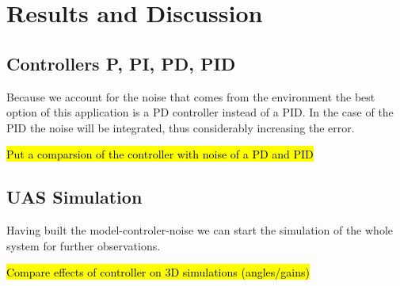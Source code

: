 \chapter{Results and Discussion}\label{ch:results}

\section{Controllers P, PI, PD, PID}

Because we account for the noise that comes from the environment the best option of this application is a PD controller instead of a PID. In the case of the PID the noise will be integrated, thus considerably increasing the error. 

\hl{Put a comparsion of the controller with noise of a PD and PID} 

\section{UAS Simulation}

Having built the model-controler-noise we can start the simulation of the whole system for further observations.

\hl{Compare effects of controller on 3D simulations (angles/gains)}